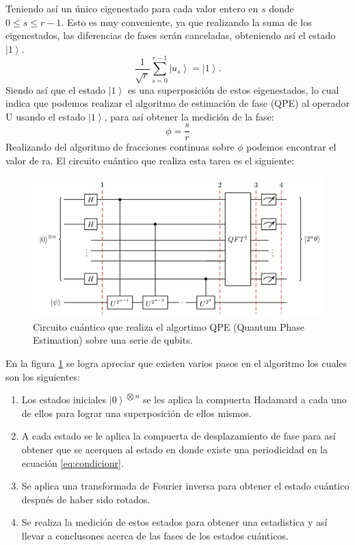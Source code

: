 Teniendo así un único eigenestado para cada valor entero en $s$ donde $0\leq s \leq r-1$. Esto es muy conveniente, ya que realizando la suma de los eigenestados, las diferencias de fases
serán canceladas, obteniendo así el estado $ \left| 1 \right\rangle$.
\begin{equation*}
    \frac{1}{\sqrt{r}} \sum\limits_{s=0}^{r-1} \left|u_s \right\rangle =  \left| 1 \right\rangle.
\end{equation*}
Siendo así que el estado $ \left| 1 \right\rangle$ es una superposición de estos eigenestados, lo cual indica que podemos realizar 
el algoritmo de estimación de fase (QPE)  al operador U usando el estado $ \left| 1 \right\rangle$, para así obtener la medición de la fase:
\begin{equation*}
    \phi = \frac{s}{r}
\end{equation*}
Realizando del algoritmo de fracciones continuas sobre $\phi$ podemos encontrar el valor de ra. El circuito cuántico que realiza esta tarea es el siguiente:
\begin{figure}[H]
    \includegraphics[scale=0.4]{../Graphics/qpe.png}
    \caption{Circuito cuántico que realiza el algortimo QPE (Quantum Phase Estimation) sobre una serie de qubits.}
    \label{fig:qpe}
\end{figure}
En la figura \ref{fig:qpe} se logra apreciar que existen varios pasos en el algoritmo los cuales son los siguientes:
\begin{enumerate}
    \item Los estados iniciales $\left|0  \right\rangle^{\bigotimes n}$ se les aplica la compuerta Hadamard a cada uno de ellos para lograr una superposición de ellos mismos.
    \item A cada estado se le aplica la compuerta de desplazamiento de fase para así obtener que se acerquen al estado en donde existe una periodicidad en la ecuación \ref{eq:condicionr}.
    \item Se aplica una transformada de Fourier inversa para obtener el estado cuántico después de haber sido rotados.
    \item Se realiza la medición de estos estados para obtener una estadistica y así llevar a conclusones acerca de las fases de los estados cuánticos.
\end{enumerate}